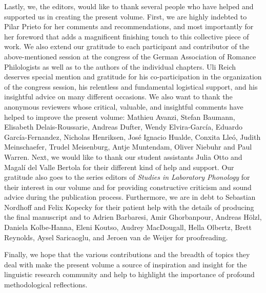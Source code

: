 \documentclass[output=paper]{langsci/langscibook}
\begin{document}
Lastly, we, the editors, would like to thank several people who have helped and supported us in creating the present volume. First, we are highly indebted to Pilar Prieto for her comments and recommendations, and most importantly for her foreword that adds a magnificent finishing touch to this collective piece of work. We also extend our gratitude to each participant and contributor of the above-mentioned session at the congress of the German Association of Romance Philologists as well as to the authors of the individual chapters. Uli Reich deserves special mention and gratitude for his co-participation in the organization of the congress session, his relentless and fundamental logistical support, and his insightful advice on many different occasions. We also want to thank the anonymous reviewers whose critical, valuable, and insightful comments have helped to improve the present volume: Mathieu Avanzi, Stefan Baumann, Elisabeth Delais-Roussarie, Andreas Dufter, Wendy Elvira-García, Eduardo García-Fernandez, Nicholas Henriksen, José Ignacio Hualde, Conxita Lleó, Judith Meinschaefer, Trudel Meisenburg, Antje Muntendam, Oliver Niebuhr and Paul Warren. Next, we would like to thank our student assistants Julia Otto and Magalí del Valle Bertola for their different kind of help and support. Our gratitude also goes to the series editors of \textit{Studies in Laboratory Phonology} for their interest in our volume and for providing constructive criticism and sound advice during the publication process. Furthermore, we are in debt to Sebastian Nordhoff and Felix Kopecky for their patient help with the details of producing the final manuscript and to Adrien Barbaresi, Amir Ghorbanpour, Andreas Hölzl, Daniela Kolbe-Hanna, Eleni Koutso, Audrey MacDougall, Hella Olbertz, Brett Reynolds, Aysel Saricaoglu, and Jeroen van de Weijer for proofreading. 

\largerpage
Finally, we hope that the various contributions and the breadth of topics they deal with make the present volume a source of inspiration and insight for the linguistic research community and help to highlight the importance of profound methodological reflections. 

{\sloppy
\printbibliography[heading=subbibliography,notkeyword=this]
}
\end{document}

